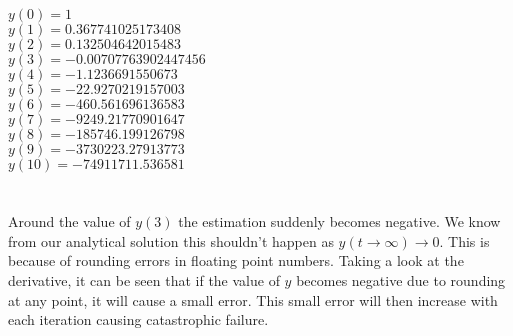\documentclass[]{article}
\begin{document}
\begin{center}
$y(0) = 1$\\
$y(1) = 0.367741025173408$\\
$y(2) = 0.132504642015483$\\
$y(3) = -0.00707763902447456$\\
$y(4) = -1.1236691550673$\\
$y(5) = -22.9270219157003$\\
$y(6) = -460.561696136583$\\
$y(7) = -9249.21770901647$\\
$y(8) = -185746.199126798$\\
$y(9) = -3730223.27913773$\\
$y(10) = -74911711.536581$\\
\end{center}

\section{}

Around the value of $y(3)$ the estimation suddenly becomes negative. We know from our analytical solution this shouldn't happen as $y(t \rightarrow \infty) \rightarrow 0$. This is because of rounding errors in floating point numbers. Taking a look at the derivative, it can be seen that if the value of $y$ becomes negative due to rounding at any point, it will cause a small error. This small error will then increase with each iteration causing catastrophic failure.
\end{document}
